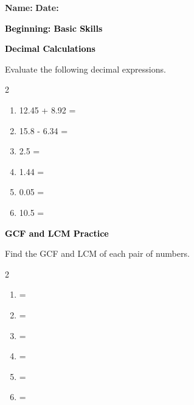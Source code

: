 \documentclass[12pt, letterpaper, fleqn]{article}
\newcommand{\blank}{\underline{\hspace{2.2cm}}}
\begin{document}
\textbf{Name:} \underline{\hspace{5cm}}
\hfill
\textbf{Date:} \underline{\hspace{3cm}}\\

\begin{tcolorbox}[colback=customteal!20]
    \large\textcolor{black}{\textbf{Beginning: Basic Skills}}
\end{tcolorbox}

\vspace{3mm}

\begin{tcolorbox}[colback=customteal!20]
\large\textcolor{black}{\textbf{Decimal Calculations}}
\end{tcolorbox}

\noindent
Evaluate the following decimal expressions.

\vspace{3mm}
\begin{multicols}{2}
\begin{enumerate}[itemsep=1cm, leftmargin=0.6cm]
\item 12.45 + 8.92 = \blank
\item 15.8 - 6.34 = \blank
\item 2.5  = \blank
\item 1.44  = \blank
\item 0.05  = \blank
\item 10.5  = \blank
\end{enumerate}
\end{multicols}
\newpage

\begin{tcolorbox}[colback=customteal!20]
\large\textcolor{black}{\textbf{GCF and LCM Practice}}
\end{tcolorbox}

\noindent
Find the GCF and LCM of each pair of numbers.

\vspace{3mm}
\begin{multicols}{2}
\begin{enumerate}[itemsep=1cm, leftmargin=0.6cm]
\item {} = \blank
\item {} = \blank
\item {} = \blank
\item {} = \blank
\item {} = \blank
\item {} = \blank
\end{enumerate}
\end{multicols}
\newpage
\end{document}
